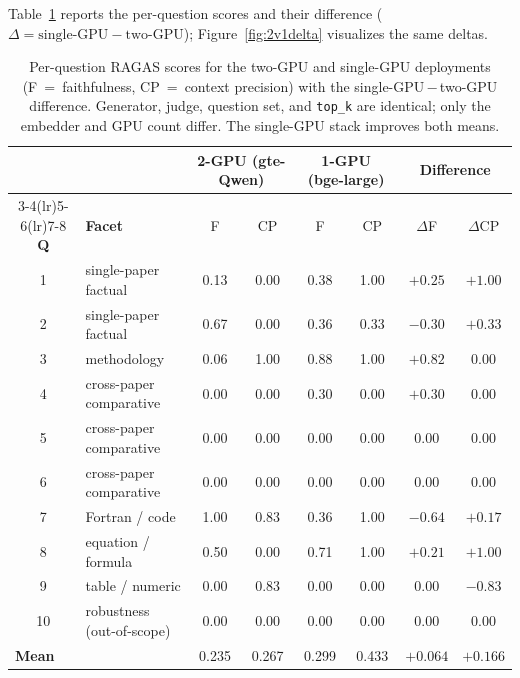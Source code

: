 \documentclass[11pt,a4paper]{article}
\newcommand{\code}[1]{\texttt{\small #1}}
\begin{document}
Table~\ref{tab:2v1} reports the per-question scores and their difference
($\Delta = \text{single-GPU} - \text{two-GPU}$); Figure~\ref{fig:2v1delta}
visualizes the same deltas.

\begin{table}[H]
\centering
\small
\renewcommand{\arraystretch}{1.15}
\begin{tabular}{c l cc cc cc}
\toprule
& & \multicolumn{2}{c}{\textbf{2-GPU (gte-Qwen)}}
  & \multicolumn{2}{c}{\textbf{1-GPU (bge-large)}}
  & \multicolumn{2}{c}{\textbf{Difference}} \\
\cmidrule(lr){3-4}\cmidrule(lr){5-6}\cmidrule(lr){7-8}
\textbf{Q} & \textbf{Facet} & F & CP & F & CP & $\Delta$F & $\Delta$CP \\
\midrule
1  & single-paper factual      & 0.13 & 0.00 & 0.38 & 1.00 & $+0.25$ & $+1.00$ \\
2  & single-paper factual      & 0.67 & 0.00 & 0.36 & 0.33 & $-0.30$ & $+0.33$ \\
3  & methodology               & 0.06 & 1.00 & 0.88 & 1.00 & $+0.82$ & $0.00$  \\
4  & cross-paper comparative   & 0.00 & 0.00 & 0.30 & 0.00 & $+0.30$ & $0.00$  \\
5  & cross-paper comparative   & 0.00 & 0.00 & 0.00 & 0.00 & $0.00$  & $0.00$  \\
6  & cross-paper comparative   & 0.00 & 0.00 & 0.00 & 0.00 & $0.00$  & $0.00$  \\
7  & Fortran / code            & 1.00 & 0.83 & 0.36 & 1.00 & $-0.64$ & $+0.17$ \\
8  & equation / formula        & 0.50 & 0.00 & 0.71 & 1.00 & $+0.21$ & $+1.00$ \\
9  & table / numeric           & 0.00 & 0.83 & 0.00 & 0.00 & $0.00$  & $-0.83$ \\
10 & robustness (out-of-scope) & 0.00 & 0.00 & 0.00 & 0.00 & $0.00$  & $0.00$  \\
\midrule
\multicolumn{2}{l}{\textbf{Mean}} & 0.235 & 0.267 & 0.299 & 0.433
  & $\mathbf{+0.064}$ & $\mathbf{+0.166}$ \\
\bottomrule
\end{tabular}
\caption{Per-question RAGAS scores for the two-GPU and single-GPU deployments
(F~=~faithfulness, CP~=~context precision) with the single-GPU\,$-$\,two-GPU
difference. Generator, judge, question set, and \code{top\_k} are identical; only
the embedder and GPU count differ. The single-GPU stack improves both means.}
\label{tab:2v1}
\end{table}
\end{document}
